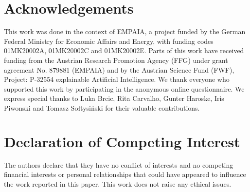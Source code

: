 \section*{Acknowledgements}

This work was done in the context of EMPAIA, a project funded by the German Federal Ministry for Economic Affairs and Energy, with funding codes 01MK20002A, 01MK20002C and 01MK20002E. Parts of this work have received funding from the Austrian Research Promotion Agency (FFG) under grant agreement No. 879881 (EMPAIA) and by the Austrian Science Fund (FWF), Project: P-32554 explainable Artificial Intelligence. We thank everyone who supported this work by participating in the anonymous online questionnaire. We express special thanks to Luka Brcic, Rita Carvalho, Gunter Haroske, Iris Piwonski and Tomasz Sołtysiński for their valuable contributions. 

\section*{Declaration of Competing Interest}

The authors declare that they have no conflict of interests and no competing financial interests or personal relationships that could have appeared to influence the work reported in this paper. This work does not raise any ethical issues.
